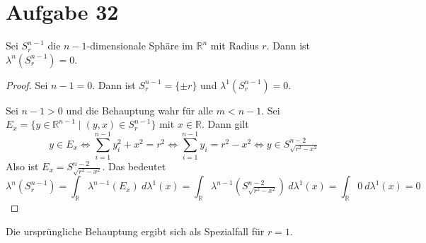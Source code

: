 \documentclass[10pt,a4paper]{article}
\begin{document}
\section{Aufgabe 32}
Sei $S_{r}^{n - 1}$ die $n - 1$-dimensionale Sphäre im $\mathbb{R}^{n}$ mit Radius $r$.
Dann ist $\lambda^{n}(S_{r}^{n - 1}) = 0$.
\begin{proof}
  Sei $n - 1 = 0$.
  Dann ist $S_{r}^{n - 1} = \{ \pm r \}$ und $\lambda^{1}(S_{r}^{n - 1}) = 0$.

  Sei $n - 1 > 0$ und die Behauptung wahr für alle $m < n - 1$.
  Sei $E_{x} = \{ y \in \mathbb{R}^{n - 1} \mid (y, x) \in S_{r}^{n - 1} \}$ mit $x \in \mathbb{R}$.
  Dann gilt
  \begin{equation}
     y \in E_{x} \Leftrightarrow \sum_{i = 1}^{n - 1} y_{i}^{2} + x^{2} = r^{2} \Leftrightarrow \sum_{i = 1}^{n - 1} y_{i} = r^{2} - x^{2} \Leftrightarrow y \in S_{\sqrt{r^{2} - x^{2}}}^{n - 2}
  \end{equation}
  Also ist $E_{x} = S_{\sqrt{r^{2} - x^{2}}}^{n - 2}$.
  Das bedeutet
  \begin{equation}
    \lambda^{n}(S_{r}^{n - 1}) = \int_{\mathbb{R}} \lambda^{n - 1}(E_{x})\ d\lambda^{1}(x) = \int_{\mathbb{R}} \lambda^{n - 1}(S_{\sqrt{r^{2} - x^{2}}}^{n - 2})\ d\lambda^{1}(x) = \int_{\mathbb{R}} 0\ d\lambda^{1}(x) = 0
  \end{equation}
\end{proof}
Die ursprüngliche Behauptung ergibt sich als Spezialfall für $r = 1$.
\end{document}
